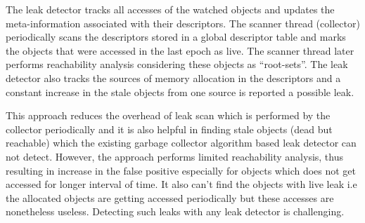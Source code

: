 The leak detector tracks all accesses of the watched objects and updates the meta-information associated with their descriptors. The scanner thread (collector) periodically scans the descriptors stored in a global descriptor table and marks the objects that were accessed in the last epoch as live. The scanner thread later performs reachability analysis considering these objects as ``root-sets''.  The leak detector also tracks the sources of memory allocation in the descriptors and a constant increase in the stale objects from one source is reported a possible leak.


This approach reduces the overhead of leak scan which is performed by the collector periodically and it is also helpful in finding stale objects (dead but reachable) which the existing garbage collector algorithm based leak detector can not detect. However, the approach performs limited reachability analysis, thus resulting in increase in the false positive especially for objects which does not get accessed for longer interval of time. It also can't find the objects with live leak i.e the allocated objects are getting accessed periodically but these accesses are nonetheless useless. Detecting such leaks with any leak detector is challenging.







